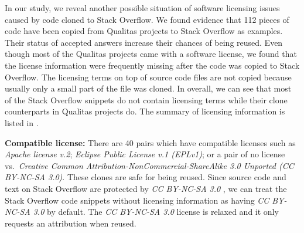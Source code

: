 \documentclass[10pt,journal,compsoc]{IEEEtran}
\begin{document}
In our study, we reveal another possible situation of software
licensing issues caused by code cloned to Stack Overflow. We found
evidence that 112 pieces of code have been copied from Qualitas
projects to Stack Overflow as examples. Their status of accepted
answers increase their chances of being reused. Even though most of
the Qualitas projects came with a software license, we found that the license information
were frequently missing after the code was copied to Stack
Overflow. The licensing terms on top of source code files are not
copied because usually only a small part of the file was
cloned. In overall, we can see that most of the Stack Overflow snippets do not
contain licensing terms while their clone counterparts in Qualitas
projects do. The summary of
licensing information is listed in .

\textbf{Compatible license:} There are 40 pairs which have compatible
licenses such as \emph{Apache license v.2}; \emph{Eclipse Public
	License v.1 (EPLv1)}; or a pair of no license vs.~\emph{Creative
	Common Attribution-NonCommercial-ShareAlike 3.0 Unported (CC
	BY-NC-SA 3.0)}. These clones are safe for being reused. Since source
code and text on Stack Overflow are
protected by \emph{CC BY-NC-SA 3.0}
, we can treat the Stack Overflow code snippets
without licensing information as having \emph{CC BY-NC-SA 3.0} by
default. The \emph{CC BY-NC-SA 3.0} license is relaxed and it only
requests an attribution when reused.
\end{document}
